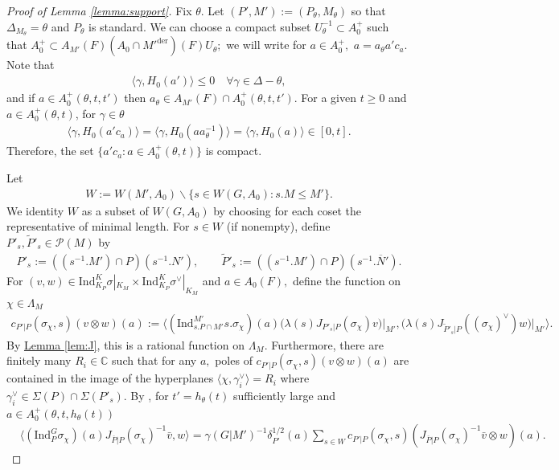\documentclass[10pt]{amsart}
\theoremstyle{definition}
\numberwithin{equation}{section}
\numberwithin{equation}{subsection}
\newcommand{\Ind}{\mathrm{Ind}}
\newcommand{\CC}{\mathbb{C}}
\begin{document}
\begin{proof}[Proof of Lemma \ref{lemma:support}] Fix $\theta$. Let $(P',M'):=(P_\theta,M_\theta)$ so that $\Delta_{M_\theta}=\theta$ and $P_\theta$ is standard. We can choose a compact subset $U_\theta^{-1}\subset A_0^+$ such that $A_0^+\subset A_{M'}(F)(A_{0}\cap M'^{\mathrm{der}})(F)U_\theta;$ we will write for $a\in A_0^+,$ $a=a_\theta a'c_a.$ Note that 
\begin{align*}
    \langle \gamma,H_0(a')\rangle\le 0\quad \forall \gamma\in \Delta-\theta,
\end{align*}
and if $a\in A_0^+(\theta,t,t')$ then $a_\theta\in A_{M'}(F)\cap A_0^+(\theta,t,t').$ For a given $t\ge 0$ and  $a\in A_0^+(\theta,t)$, for $\gamma\in \theta$
\begin{align*}
    \langle\gamma, H_0(a'c_a)\rangle=\langle\gamma,H_0(aa_\theta^{-1})\rangle=\langle \gamma,H_0(a)\rangle\in [0,t].
\end{align*}
Therefore, the set $\{ a'c_a:a\in A_0^+(\theta,t)\}$ is compact.

Let 
\begin{align*}
   W:=W(M',A_0)\backslash \{s\in W(G,A_0): s. M\le M'\}.
\end{align*}
We identity $W$ as a subset of $W(G,A_0)$ by choosing for each coset the representative of minimal length. For $s\in W$ (if nonempty), define $P'_s,\widetilde{P}'_s\in \mathcal{P}(M)$ by
\begin{align*}
    P'_s:=((s^{-1}. M')\cap P)(s^{-1}.N'),\quad\quad \widetilde{P}'_s:=((s^{-1}.M')\cap P)(s^{-1}.\overline{N}').
\end{align*}
For $(v,w)\in \mathrm{Ind}_{K_{P}}^K\sigma|_{K_M}\times \mathrm{Ind}_{K_P}^K\sigma^\lor |_{K_M}$ and $a\in A_0(F),$ define the function on $\chi\in \Lambda_M$
\begin{align*}
    c_{P'|P}(\sigma_\chi,s)(v\otimes w)(a):=\bigg\langle (\mathrm{Ind}_{s.P\cap M'}^{M'}s.\sigma_\chi)(a)\bigg(\lambda(s)J_{P'_{s}|P}(\sigma_\chi)v\bigg)\bigg|_{M'},\bigg(\lambda(s)J_{\widetilde{P}'_s|P}((\sigma_\chi)^\lor)w\bigg)\bigg|_{M'}\bigg\rangle.
\end{align*}
By \hyperref[lem:J]{Lemma \ref{lem:J}}, this is a rational function on $\Lambda_M.$ Furthermore, there are finitely many $R_i\in\CC$ such that for any $a,$ poles of $c_{P'|P}(\sigma_\chi,s)(v\otimes w)(a)$ are contained in the image of the hyperplanes $\langle \chi,\gamma_i^\lor\rangle =R_i$ where $\gamma_i^\lor\in \Sigma(P)\cap \Sigma(P'_s).$ By \cite[Th\'eor\`eme 1.3.1]{Heiermann:HeckePlan}, for $t'=h_\theta(t)$ sufficiently large and $a\in A_0^+(\theta,t,h_\theta(t))$
\begin{align*}
    &\langle (\Ind_P^G\sigma_\chi)(a)J_{\overline{P}|P}(\sigma_\chi)^{-1}\bar{v},w\rangle=\gamma(G|M')^{-1}\delta_{P'}^{1/2}(a)\sum_{s\in W} c_{P'|P}(\sigma_\chi,s)(J_{\overline{P}|P}(\sigma_\chi)^{-1}\bar{v}\otimes w)(a).
\end{align*}


\end{proof}
\end{document}

